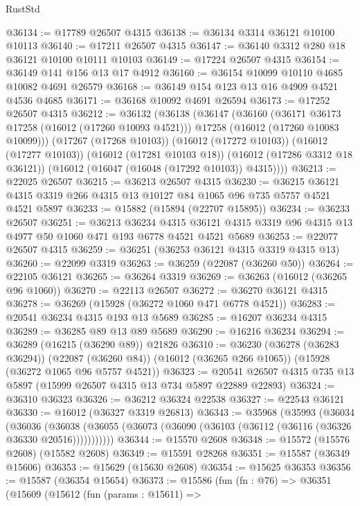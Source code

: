 \begin{lexlean}{RustStd}
\begin{coremodule}
@36134 := @17789 @26507 @4315
@36138 := @36134 @3314 @36121 @10100 @10113
@36140 := @17211 @26507 @4315
@36147 := @36140 @3312 @280 @18 @36121 @10100 @10111 @10103
@36149 := @17224 @26507 @4315
@36154 := @36149 @141 @156 @13 @17 @4912
@36160 := @36154 @10099 @10110 @4685 @10082 @4691 @26579
@36168 := @36149 @154 @123 @13 @16 @4909 @4521 @4536 @4685
@36171 := @36168 @10092 @4691 @26594
@36173 := @17252 @26507 @4315
@36212 := @36132
    (@36138
      (@36147
        (@36160
          (@36171 @36173 @17258 (@16012 (@17260 @10093 @4521)))
          @17258
          (@16012 (@17260 @10083 @10099)))
        (@17267 (@17268 @10103))
        (@16012 (@17272 @10103))
        (@16012 (@17277 @10103))
        (@16012 (@17281 @10103 @18))
        (@16012 (@17286 @3312 @18 @36121))
        (@16012 (@16047 (@16048 (@17292 @10103)) @4315))))
@36213 := @22025 @26507
@36215 := @36213 @26507 @4315
@36230 := @36215 @36121 @4315 @3319 @266 @4315 @13 @10127 @84 @1065 @96 @735 @5757 @4521 @4521 @5897
@36233 := @15882 (@15894 (@22707 @15895))
@36234 := @36233 @26507
@36251 := @36213
    @36234
    @4315
    @36121
    @4315
    @3319
    @96
    @4315
    @13
    @4977
    @50
    @1060
    @471
    @193
    @6778
    @4521
    @4521
    @5689
@36253 := @22077 @26507 @4315
@36259 := @36251 (@36253 @36121 @4315 @3319 @4315 @13)
@36260 := @22099 @3319
@36263 := @36259 (@22087 (@36260 @50))
@36264 := @22105 @36121
@36265 := @36264 @3319
@36269 := @36263 (@16012 (@36265 @96 @1060))
@36270 := @22113 @26507
@36272 := @36270 @36121 @4315
@36278 := @36269 (@15928 (@36272 @1060 @471 @6778 @4521))
@36283 := @20541 @36234 @4315 @193 @13 @5689
@36285 := @16207 @36234 @4315
@36289 := @36285 @89 @13 @89 @5689
@36290 := @16216 @36234
@36294 := @36289 (@16215 (@36290 @89)) @21826
@36310 := @36230
    (@36278 (@36283 @36294))
    (@22087 (@36260 @84))
    (@16012 (@36265 @266 @1065))
    (@15928 (@36272 @1065 @96 @5757 @4521))
@36323 := @20541 @26507 @4315 @735 @13 @5897 (@15999 @26507 @4315 @13 @734 @5897 @22889 @22893)
@36324 := @36310 @36323
@36326 := @36212 @36324 @22538
@36327 := @22543 @36121
@36330 := @16012 (@36327 @3319 @26813)
@36343 := @35968
    (@35993
      (@36034
        (@36036
          (@36038 (@36055 (@36073 (@36090 (@36103 (@36112 (@36116 (@36326 @36330 @20516)))))))))))
@36344 := @15570 @2608
@36348 := @15572 (@15576 @2608) (@15582 @2608)
@36349 := @15591 @28268
@36351 := @15587 (@36349 @15606)
@36353 := @15629 (@15630 @2608)
@36354 := @15625 @36353
@36356 := @15587 (@36354 @15654)
@36373 := @15586
    (fun (fn : @76) =>
    @36351
      (@15609
        (@15612
          (fun (params : @15611) =>

\end{coremodule}
\end{lexlean}
